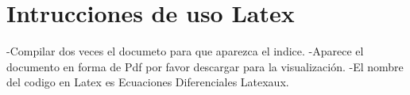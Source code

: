 \documentclass[11pt,a4paper]{article}
\begin{document}
\part{Intrucciones de uso  Latex}
-Compilar dos veces el documeto para que aparezca el indice.
-Aparece el documento en forma de Pdf por favor descargar para la visualización.
-El nombre del codigo en Latex es Ecuaciones Diferenciales Latexaux.
\end{document}
